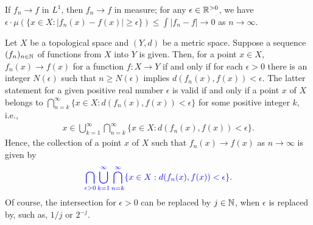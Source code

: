 \begin{obs}
    If $f_n\rightarrow f$ in $L^1$, then $f_n\rightarrow f$ in measure;
    for any $\epsilon\in{\mathbb{R}}^{>0}$, we have $\epsilon\cdot\mu(\{x\in X: |f_n(x)-f(x)|\geq \epsilon\})\leq\int|f_n-f|\rightarrow 0$ as $n\rightarrow\infty$.
\end{obs}

\begin{obs}\label{the set of convergences}
    Let $X$ be a topological space and $(Y, d)$ be a metric space.
    Suppose a sequence $(f_n)_{n\in{\mathbb{N}}}$ of functions from $X$ into $Y$ is given.
    Then, for a point $x\in X$, $f_n(x)\rightarrow f(x)$ for a function $f: X\rightarrow Y$ if and only if for each $\epsilon>0$ there is an integer $N(\epsilon)$ such that $n\geq N(\epsilon)$ implies $d(f_n(x), f(x))<\epsilon$.
    The latter statement for a given positive real number $\epsilon$ is valid if and only if a point $x$ of $X$ belongs to $\bigcap_{n=k}^\infty\{x\in X: d(f_n(x), f(x))<\epsilon\}$ for some positive integer $k$, i.e.,
    \begin{align*}
        x\in\bigcup_{k=1}^\infty\bigcap_{n=k}^\infty\{x\in X: d(f_n(x), f(x))<\epsilon\}.
    \end{align*}
    Hence, the collection of a point $x$ of $X$ such that $f_n(x)\rightarrow f(x)$ as $n\rightarrow\infty$ is given by
    \begin{align*}
        \color{blue}\bigcap_{\epsilon>0} \bigcup_{k=1}^\infty \bigcap_{n=k}^\infty \{x\in X: d(f_n(x), f(x))<\epsilon\}\color{black}.
    \end{align*}
    Of course, the intersection for $\epsilon>0$ can be replaced by $j\in{\mathbb{N}}$, when $\epsilon$ is replaced by, such as, $1/j$ or $2^{-j}$.
\end{obs}

